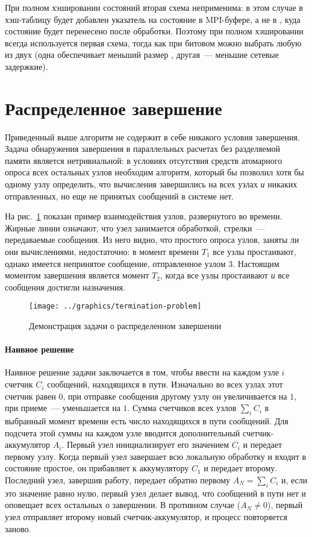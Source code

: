 При полном хэшировании состояний вторая схема неприменима: в этом случае в хэш-таблицу
будет добавлен указатель на состояние в MPI-буфере, а не в , куда состояние
будет перенесено после обработки. Поэтому при полном хэшировании всегда используется
первая схема, тогда как при битовом можно выбрать любую из двух (одна обеспечивает меньший
размер , другая~--- меньшие сетевые задержкие).

\section{Распределенное завершение}
\label{sec:distributed-termination}

Приведенный выше алгоритм не содержит в себе никакого условия завершения. Задача
обнаружения завершения в параллельных расчетах без разделяемой памяти является
нетривиальной: в условиях отсутствия средств атомарного опроса всех остальных узлов
необходим алгоритм, который бы позволил хотя бы одному узлу определить, что вычисления
завершились на всех узлах \emph{и} никаких отправленных, но еще не принятых сообщений в
системе нет.

На рис.~\ref{fig:termination-problem} показан пример взаимодействия узлов, развернутого во
времени. Жирные линии означают, что узел занимается обработкой, стрелки~--- передаваемые
сообщения. Из него видно, что простого опроса узлов, заняты ли они вычислениями,
недостаточно: в момент времени $T_1$ все узлы простаивают, однако имеется непринятое
сообщение, отправленное узлом 3. Настоящим моментом завершения является момент $T_2$,
когда все узлы простаивают \emph{и} все сообщения достигли назначения.

\begin{figure}[htb]
  \centering
  \texttt{[image: ../graphics/termination-problem]}  
  \caption{Демонстрация задачи о распределенном завершении}
\label{fig:termination-problem}
\end{figure}

\paragraph{Наивное решение}
\label{sec:distr-term-dijkstra}

Наивное решение задачи заключается в том, чтобы ввести на каждом узле $i$ счетчик $C_i$
сообщений, находящихся в пути. Изначально во всех узлах этот счетчик равен $0$, при
отправке сообщения другому узлу он увеличивается на $1$, при приеме~--- уменьшается на
$1$. Сумма счетчиков всех узлов $\sum_iC_i$ в выбранный момент времени есть число
находящихся в пути сообщений. Для подсчета этой суммы на каждом узле вводится
дополнительный счетчик-аккумулятор $A_i$. Первый узел инициализирует его значением $C_i$ и
передает первому узлу. Когда первый узел завершает всю локальную обработку и входит в
состояние простое, он прибавляет к аккумулятору $C_1$ и передает второму\etc. Последний
узел, завершив работу, передает обратно первому $A_N = \sum_iC_i$ и, если это значение
равно нулю, первый узел делает вывод, что сообщений в пути нет и оповещает всех остальных
о завершении. В противном случае ($A_N \neq 0$), первый узел отправляет второму новый
счетчик-аккумулятор, и процесс повторяется заново.

